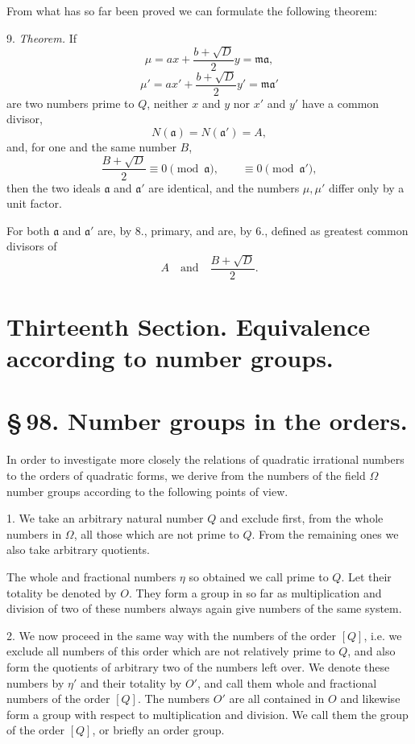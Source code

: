 \documentclass[11pt]{article}
\begin{document}
From what has so far been proved we can formulate the following theorem:

9. \emph{Theorem.} If
\[
 \mu=ax+\frac{b+\sqrt D}{2}y=\mathfrak m\mathfrak a,
\]
\[
 \mu'=ax'+\frac{b+\sqrt D}{2}y'=\mathfrak m\mathfrak a'
\]
are two numbers prime to $Q$, neither $x$ and $y$ nor $x'$ and $y'$ have a common divisor,
\[
 N(\mathfrak a)=N(\mathfrak a')=A,
\]
and, for one and the same number $B$,
\[
 \frac{B+\sqrt D}{2}\equiv0\pmod{\mathfrak a},
 \qquad
 \equiv0\pmod{\mathfrak a'},
\]
then the two ideals $\mathfrak a$ and $\mathfrak a'$ are identical, and the numbers $\mu,\mu'$ differ only by a unit factor.

For both $\mathfrak a$ and $\mathfrak a'$ are, by 8., primary, and are, by 6., defined as greatest common divisors of
\[
 A\quad\text{and}\quad \frac{B+\sqrt D}{2}.
\]

\section*{Thirteenth Section. Equivalence according to number groups.}

\section*{\S\,98. Number groups in the orders.}

In order to investigate more closely the relations of quadratic irrational numbers to the orders of quadratic forms, we derive from the numbers of the field $\Omega$ number groups according to the following points of view.

1. We take an arbitrary natural number $Q$ and exclude first, from the whole numbers in $\Omega$, all those which are not prime to $Q$. From the remaining ones we also take arbitrary quotients.

The whole and fractional numbers $\eta$ so obtained we call prime to $Q$. Let their totality be denoted by $O$. They form a group in so far as multiplication and division of two of these numbers always again give numbers of the same system.

2. We now proceed in the same way with the numbers of the order $[Q]$, i.e. we exclude all numbers of this order which are not relatively prime to $Q$, and also form the quotients of arbitrary two of the numbers left over. We denote these numbers by $\eta'$ and their totality by $O'$, and call them whole and fractional numbers of the order $[Q]$. The numbers $O'$ are all contained in $O$ and likewise form a group with respect to multiplication and division. We call them the group of the order $[Q]$, or briefly an order group.
\end{document}
